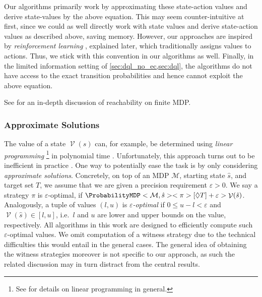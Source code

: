 \documentclass{theoretics}
\newcommand{\MDP}{\mathcal{M}}
\newcommand{\initialstate}{\hat{s}}
\newcommand{\strategy}{\pi}
\newcommand{\reach}{\Diamond}
\DeclareMathOperator{\val}{\mathcal{V}}
\newcommand{\targetset}{T}
\begin{document}
\begin{remark}
	Our algorithms primarily work by approximating these state-action values and derive state-values by the above equation.
	This may seem counter-intuitive at first, since we could as well directly work with state values and derive state-action values as described above, saving memory.
	However, our approaches are inspired by \emph{reinforcement learning} \cite{DBLP:books/lib/SuttonB98}, explained later, which traditionally assigns values to actions.
	Thus, we stick with this convention in our algorithms as well.
	Finally, in the limited information setting of \cref{sec:dql_no_ec,sec:dql}, the algorithms do not have access to the exact transition probabilities and hence cannot exploit the above equation.
\end{remark}
See \cite[Section~4]{DBLP:conf/sfm/ForejtKNP11} for an in-depth discussion of reachability on finite MDP.

\subsubsection*{Approximate Solutions}

The value of a state $\val(s)$ can, for example, be determined using \emph{linear programming} \cite{10.1007/BFb0032043,DBLP:conf/sfm/ForejtKNP11}\footnote{See \cite{DBLP:books/daglib/0090562} for details on linear programming in general.} in polynomial time \cite{khachiyan1979polynomial,DBLP:journals/combinatorica/Karmarkar84}.
Unfortunately, this approach turns out to be inefficient in practice \cite{DBLP:conf/rp/HaddadM14,DBLP:conf/cav/AshokCDKM17}.
One way to potentially ease the task is by only considering \emph{approximate solutions}.
Concretely, on top of an MDP $\MDP$, starting state $\initialstate$, and target set $\targetset$, we assume that we are given a precision requirement $\varepsilon > 0$.
We say a strategy $\strategy$ is $\varepsilon$-optimal, if $\ProbabilityMDP<\MDP, \initialstate><\strategy>[\reach \targetset] + \varepsilon > \val(\initialstate)$.
Analogously, a tuple of values $(l, u)$ is \emph{$\varepsilon$-optimal} if $0 \leq u - l < \varepsilon$ and $\val(\initialstate) \in [l, u]$, i.e.\ $l$ and $u$ are lower and upper bounds on the value, respectively.
All algorithms in this work are designed to efficiently compute such $\varepsilon$-optimal values.
We omit computation of a witness strategy due to the technical difficulties this would entail in the general cases.
The general idea of obtaining the witness strategies moreover is not specific to our approach, as such the related discussion may in turn distract from the central results.
\end{document}
